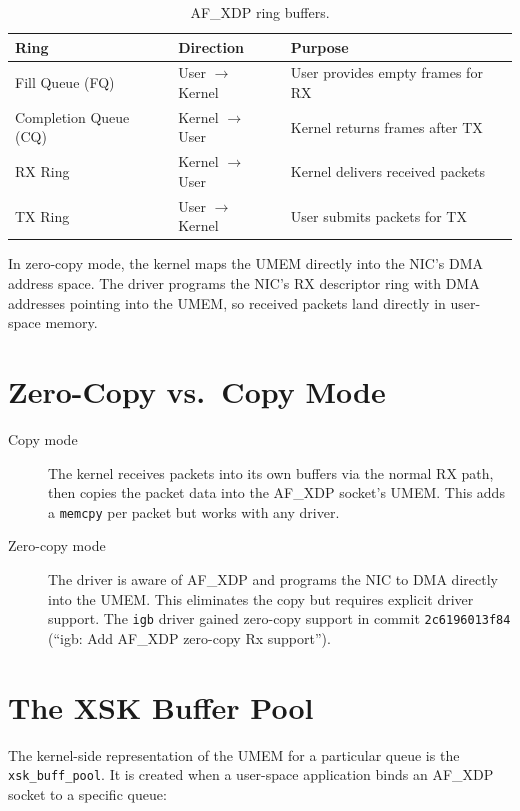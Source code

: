 \documentclass[11pt,a4paper,openany]{book}
\newcommand{\sym}[1]{\texttt{#1}}
\begin{document}
\begin{table}[H]
\centering
\begin{tabular}{lll}
\toprule
\textbf{Ring} & \textbf{Direction} & \textbf{Purpose} \\
\midrule
Fill Queue (FQ)      & User $\to$ Kernel & User provides empty frames for RX \\
Completion Queue (CQ)& Kernel $\to$ User & Kernel returns frames after TX \\
RX Ring              & Kernel $\to$ User & Kernel delivers received packets \\
TX Ring              & User $\to$ Kernel & User submits packets for TX \\
\bottomrule
\end{tabular}
\caption{AF\_XDP ring buffers.}
\end{table}

In zero-copy mode, the kernel maps the UMEM directly into the NIC's DMA
address space.  The driver programs the NIC's RX descriptor ring with
DMA addresses pointing into the UMEM, so received packets land directly
in user-space memory.

\section{Zero-Copy vs.\ Copy Mode}

\begin{description}
\item[Copy mode] The kernel receives packets into its own buffers via
    the normal RX path, then copies the packet data into the AF\_XDP
    socket's UMEM.  This adds a \texttt{memcpy} per packet but works
    with any driver.
\item[Zero-copy mode] The driver is aware of AF\_XDP and programs the
    NIC to DMA directly into the UMEM.  This eliminates the copy but
    requires explicit driver support.  The \texttt{igb} driver gained
    zero-copy support in commit \texttt{2c6196013f84} (``igb: Add AF\_XDP
    zero-copy Rx support'').
\end{description}

\section{The XSK Buffer Pool}

The kernel-side representation of the UMEM for a particular queue is
the \sym{xsk\_buff\_pool}.  It is created when a user-space application
binds an AF\_XDP socket to a specific queue:
\end{document}

